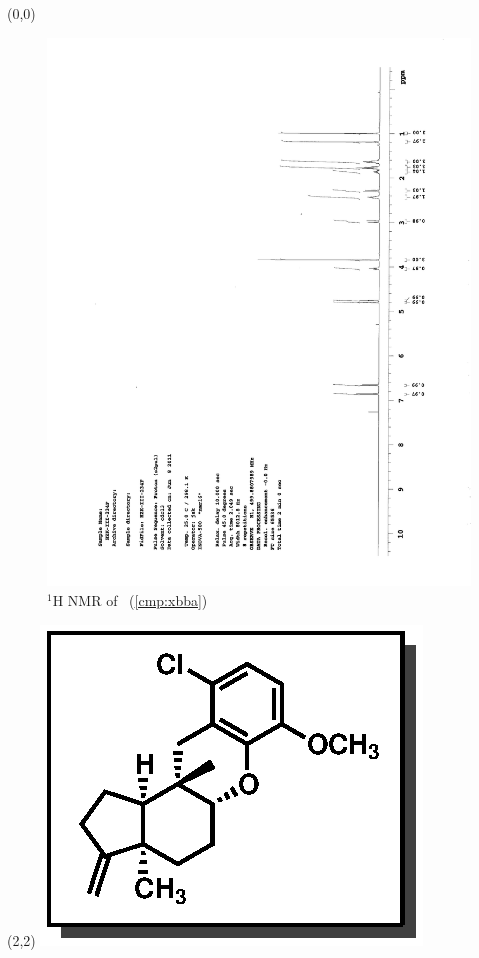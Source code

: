 
\begin{textblock}{20}(0,0)
\begin{figure}[htb]
\caption{$^1$H NMR of \CMPxbba\ (\ref{cmp:xbba})}
\includegraphics[scale=0.75, trim = 0mm 0mm 0mm 5mm,
clip]{chp_singlecarbon/images/nmr/xbbaH}
\vspace{-100pt}
\end{figure}
\end{textblock}
\begin{textblock}{1}(2,2)
\includegraphics[scale=0.8, angle=90]{chp_singlecarbon/images/xbba}
\end{textblock}
